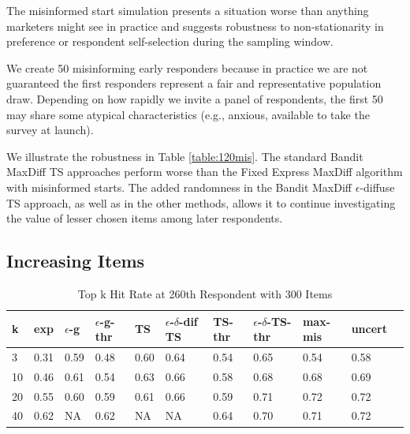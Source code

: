 \documentclass[a4paper,11pt]{article}
\newcommand{\fixedexpressS}{\textbf{exp}}
\newcommand{\egreedyS}{$\epsilon$-\textbf{g}}
\newcommand{\egreedythresS}{$\epsilon$-\textbf{g-thr}}
\newcommand{\misminS}{\textbf{max-mis}}
\newcommand{\tsS}{\textbf{TS} }
\newcommand{\edtsS}{$\epsilon$-$\delta$-\textbf{dif TS} }
\newcommand{\tsthresS}{\textbf{TS-thr} }
\newcommand{\edtsthresS}{$\epsilon$-$\delta$-\textbf{TS-thr} }
\newcommand{\uncertS}{\textbf{uncert} }
\begin{document}
The misinformed start simulation presents a situation worse than anything marketers might see in practice and suggests robustness to non-stationarity in preference or respondent self-selection during the sampling window.

We create 50 misinforming early responders because in practice we are not guaranteed the first responders represent a fair and representative population draw. Depending on how rapidly we invite a panel of respondents, the first 50 may share some atypical characteristics (e.g., anxious, available to take the survey at launch).

We illustrate the robustness in Table \ref{table:120mis}. The standard Bandit MaxDiff TS approaches perform worse than the Fixed Express MaxDiff algorithm with misinformed starts. The added randomness in the Bandit MaxDiff $\epsilon$-diffuse TS approach, as well as in the other methods, allows it to continue investigating the value of lesser chosen items among later respondents.

\subsection{Increasing Items}
\begin{table}
\caption{Top k Hit Rate at 260th Respondent with 300 Items}
\begin{center}
\begin{tabular}{lllllllllll}
\hline   k &  \fixedexpressS & \egreedyS&\egreedythresS&\tsS&\edtsS&\tsthresS&\edtsthresS& \misminS& \uncertS \\ \hline 
3&   0.31 &   0.59 & 0.48 & 0.60 &  0.64 & 0.54 & 0.65 & 0.54 &   0.58 \\ 
10 & 0.46 &   0.61 & 0.54 & 0.63  & 0.66 & 0.58 & 0.68 & 0.68  &   0.69 \\ 
20 & 0.55 &   0.60 & 0.59 &  0.61 & 0.66 & 0.59 & 0.71 &       0.72 &   0.72\\ 
40 & 0.62 &   NA & 0.62 & NA &  NA & 0.64 & 0.70 & 0.71 & 0.72 \end{tabular}
\end{center}
\label{table:300at260}
\end{table}
\end{document}
